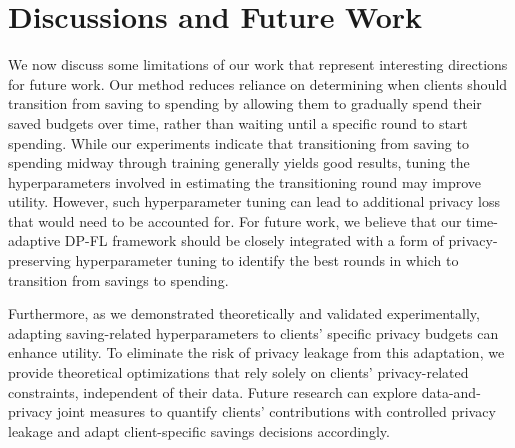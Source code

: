 \section{Discussions and Future Work}\label{ch6:future}
We now discuss some limitations of our work that represent interesting directions for future work. Our \algasgo method reduces reliance on determining when clients should transition from saving to spending by allowing them to gradually spend their saved budgets over time, rather than waiting until a specific round to start spending. While our experiments indicate that transitioning from saving to spending midway through training generally yields good results, tuning the hyperparameters involved in estimating the transitioning round may improve utility. However, such hyperparameter tuning can lead to additional privacy loss~\citep{papernot2021hyperparameter} that would need to be accounted for. For future work, we believe that our time-adaptive DP-FL framework should be closely integrated with a form of privacy-preserving hyperparameter tuning to identify the best rounds in which to transition from savings to spending.

Furthermore, as we demonstrated theoretically and validated experimentally, adapting saving-related hyperparameters to clients' specific privacy budgets can enhance utility. To eliminate the risk of privacy leakage from this adaptation, we provide theoretical optimizations that rely solely on clients' privacy-related constraints, independent of their data. Future research can explore data-and-privacy joint measures to quantify clients' contributions with controlled privacy leakage and adapt client-specific savings decisions accordingly.










